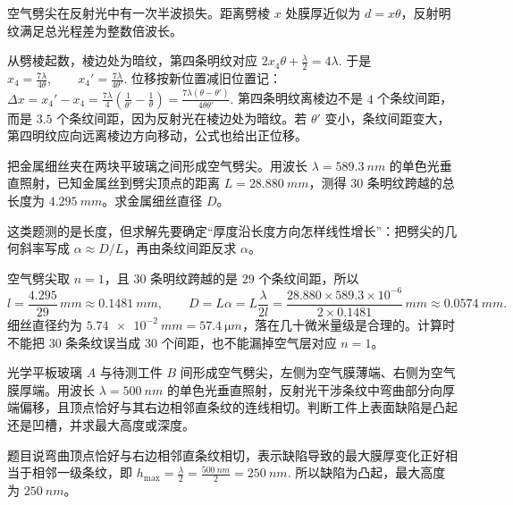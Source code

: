 \begin{solution}
空气劈尖在反射光中有一次半波损失。距离劈棱 \(x\) 处膜厚近似为 \(d=x\theta\)，反射明纹满足总光程差为整数倍波长。

从劈棱起数，棱边处为暗纹，第四条明纹对应
 \(2x_4\theta+\frac{\lambda}{2}=4\lambda.\) 
于是
 \(x_4=\frac{7\lambda}{4\theta},\qquad x_4'=\frac{7\lambda}{4\theta'}.\) 
位移按新位置减旧位置记：
 \(\Delta x=x_4'-x_4 =\frac{7\lambda}{4}\left(\frac{1}{\theta'}-\frac{1}{\theta}\right) =\frac{7\lambda(\theta-\theta')}{4\theta\theta'}.\) 
第四条明纹离棱边不是 \(4\) 个条纹间距，而是 \(3.5\) 个条纹间距，因为反射光在棱边处为暗纹。若 \(\theta'\) 变小，条纹间距变大，第四明纹应向远离棱边方向移动，公式也给出正位移。
\end{solution}


\begin{exercise}[用劈尖条纹间距测金属细丝直径时为什么先写几何斜率]
把金属细丝夹在两块平玻璃之间形成空气劈尖。用波长 \(\lambda=\SI{589.3}{nm}\) 的单色光垂直照射，已知金属丝到劈尖顶点的距离 \(L=\SI{28.880}{mm}\)，测得 \(30\) 条明纹跨越的总长度为 \(\SI{4.295}{mm}\)。求金属细丝直径 \(D\)。
\end{exercise}

\begin{solution}
这类题测的是长度，但求解先要确定“厚度沿长度方向怎样线性增长”：把劈尖的几何斜率写成 \(\alpha\approx D/L\)，再由条纹间距反求 \(\alpha\)。

空气劈尖取 \(n=1\)，且 \(30\) 条明纹跨越的是 \(29\) 个条纹间距，所以
\[
l=\frac{4.295}{29}\,\si{mm}\approx \SI{0.1481}{mm},\qquad
D=L\alpha=L\frac{\lambda}{2l}
=\frac{28.880\times 589.3\times10^{-6}}{2\times0.1481}\,\si{mm}
\approx \SI{0.0574}{mm}.
\]
细丝直径约为 \(\SI{5.74e-2}{mm}=\SI{57.4}{\micro m}\)，落在几十微米量级是合理的。计算时不能把 \(30\) 条条纹误当成 \(30\) 个间距，也不能漏掉空气层对应 \(n=1\)。
\end{solution}


\begin{exercise}[空气劈尖条纹弯向厚端时怎样判断凸凹缺陷]
光学平板玻璃 \(A\) 与待测工件 \(B\) 间形成空气劈尖，左侧为空气膜薄端、右侧为空气膜厚端。用波长 \(\lambda=\SI{500}{nm}\) 的单色光垂直照射，反射光干涉条纹中弯曲部分向厚端偏移，且顶点恰好与其右边相邻直条纹的连线相切。判断工件上表面缺陷是凸起还是凹槽，并求最大高度或深度。
\end{exercise}

\begin{solution}
题目说弯曲顶点恰好与右边相邻直条纹相切，表示缺陷导致的最大膜厚变化正好相当于相邻一级条纹，即
 \(h_{\max}=\frac{\lambda}{2} =\frac{\SI{500}{nm}}{2} =\SI{250}{nm}.\) 
所以缺陷为凸起，最大高度为 \(\SI{250}{nm}\)。
\end{solution}
